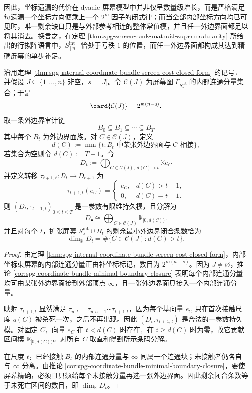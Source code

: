 \noindent
因此，坐标遗漏的代价在 dyadic 屏幕模型中并非仅呈数量级增长，而是严格满足每遗漏一个坐标方向便乘上一个 \(2^m\) 因子的闭式律；而当全部内部坐标方向均已可见时，唯一剩余缺口只是与外部参考相连的整体常值模，并且任一外边界面都足以将其消去。换言之，在定理 \ref{thm:spg-screen-rank-matroid-supermodularity} 所给出的行拟阵语言中，\(S_{[n]}^{\mathrm{int}}\) 恰处于亏秩 \(1\) 的位置，而任一外边界面都构成其达到精确屏幕的单步补足。
\begin{proposition}[坐标束闭合缺口的区间分解]\label{prop:distill-spg-coordinate-bundle-defect-intervals}
沿用定理 \ref{thm:spg-internal-coordinate-bundle-screen-cost-closed-form} 的记号，并假设 \(J\subseteq\{1,\ldots,n\}\) 非空，\(s=|J|\)。令 \(\mathcal C(J)\) 为屏幕图 \(\Gamma_{S_J^{\mathrm{int}}}\) 的内部连通分量集合；于是
\[
\card{\mathcal C(J)}=2^{m(n-s)}.
\]
取一条外边界审计链
\[
B_0\subseteq B_1\subseteq\cdots\subseteq B_T
\]
其中每个 \(B_t\) 为外边界面族。对 \(C\in\mathcal C(J)\)，定义
\[
d(C):=\min\{t: B_t\text{ 中某张外边界面与 }C\text{ 相接}\},
\]
若集合为空则令 \(d(C):=T+1\)。令
\[
D_t:=\bigoplus_{C\in\mathcal C(J),\ d(C)>t}\mathbb K e_C
\]
并定义转移 \(\tau_{t+1,t}:D_t\to D_{t+1}\) 为
\[
\tau_{t+1,t}(e_C)=
\begin{cases}
e_C,&d(C)>t+1,\\
0,&d(C)=t+1.
\end{cases}
\]
则 \((D_t,\tau_{t+1,t})_{0\le t\le T}\) 是一参数有限维持久模，且分解为
\[
D_\bullet\cong\bigoplus_{C\in\mathcal C(J)}\mathbb K_{[0,d(C))}.
\]
并且对每个 \(t\)，扩张屏幕 \(S_J^{\mathrm{int}}\cup B_t\) 的剩余最小外边界闭合条数恰为
\[
\dim_{\mathbb K}D_t=\#\{C\in\mathcal C(J):d(C)>t\}.
\]
\end{proposition}
\begin{proof}
由定理 \ref{thm:spg-internal-coordinate-bundle-screen-cost-closed-form}，内部坐标束屏幕的内部连通分量正由补坐标标记，数目为 \(2^{m(n-s)}\)。因为 \(J\ne\varnothing\)，推论 \ref{cor:spg-coordinate-bundle-minimal-boundary-closure} 表明每个内部连通分量均可由某张外边界面接到外部顶点 \(\infty\)，且一张外边界面只接入一个内部连通分量。

映射 \(\tau_{t+1,t}\) 显然满足 \(\tau_{u,t}=\tau_{u,u-1}\cdots\tau_{t+1,t}\)，因为每个基向量 \(e_C\) 只在首次接触尺度 \(d(C)\) 被杀死一次，之后不再出现。因此 \((D_t,\tau_{t+1,t})\) 是合法的一参数持久模。对固定 \(C\)，向量 \(e_C\) 在 \(t<d(C)\) 时存在，在 \(t\ge d(C)\) 时为零，故它贡献区间模 \(\mathbb K_{[0,d(C))}\)。对所有 \(C\) 取直和得到所示条码分解。

在尺度 \(t\)，已经接触 \(B_t\) 的内部连通分量与 \(\infty\) 同属一个连通块；未接触者仍各自与 \(\infty\) 分离。由推论 \ref{cor:spg-coordinate-bundle-minimal-boundary-closure}，要使屏幕精确，必须且只须给每个未接触分量再选一张外边界面。因此剩余闭合条数等于未死亡区间的数目，即 \(\dim_{\mathbb K}D_t\)。
\end{proof}
